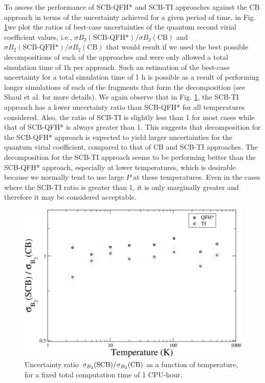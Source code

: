    To assess the performance of SCB-QFH* and SCB-TI approaches against the CB approach in terms of the uncertainty achieved for a given period of time, in Fig. \ref{uncB21Hr}we plot the ratios of best-case uncertainties of the quantum second virial coefficient values, i.e., $\sigma B_2 (\text{SCB-QFH*})/\sigma B_2 (\text{CB})$ and $\sigma B_2 (\text{SCB-QFH*} )/\sigma B_2 (\text{CB})$ that would result if we used the best possible decompositions of each of the approaches and were only allowed a total simulation time of 1h per approach. Such an estimation of the best-case uncertainty for a total simulation time of 1 h is possible as a result of performing longer simulations of each of the fragments that form the decomposition (see Shaul et al. \cite{Shaul2012} for more details). We again observe that in Fig. \ref{uncB21Hr}, the SCB-TI approach has a lower uncertainty ratio than SCB-QFH* for all temperatures considered. Also, the ratio of SCB-TI is slightly less than 1 for most cases while that of SCB-QFH* is always greater than 1. This suggests that decomposition for the SCB-QFH* approach is expected to yield larger uncertainties for the quantum virial coefficient, compared to that of CB and SCB-TI approaches. The decomposition for the SCB-TI approach seems to be performing better than the SCB-QFH* approach, especially at lower temperatures, which is desirable because we normally tend to use large $P$ at these temperatures. Even in the cases where the SCB-TI ratio is greater than 1, it is only marginally greater and therefore it may be considered acceptable.
    \begin{figure}
        \centering
        \includegraphics[scale=0.3,keepaspectratio]{Chapter-3/Figures/uncB21Hr.png}
        \caption{Uncertainty ratio $\sigma_{B_2}{\rm(SCB)}/\sigma_{B_2}{\rm{(CB)}}$ as a function of temperature, for a fixed total computation time of 1 CPU-hour.} \label{uncB21Hr}
    \end{figure}

